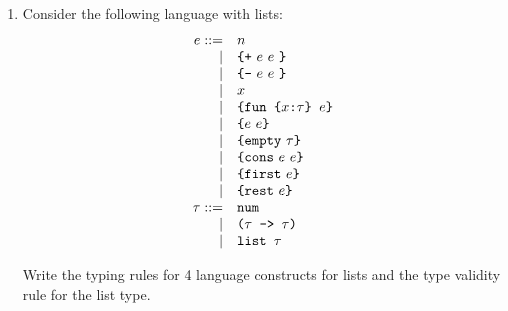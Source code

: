 \begin{enumerate}
\item Consider the following language with lists:
{
\[
\begin{array}{rl}
e ::= & n\\
\mid& \verb!{+!\ e\ e\ \verb+}+\\
\mid& \verb!{-!\ e\ e\ \verb+}+\\
\mid& x\\
\mid& \verb+{fun {+x \verb+:+\tau \verb+} + e\verb+}+\\
\mid& \verb+{+e\ e \verb+}+\\
\mid& \verb+{empty+\ \tau \verb+}+\\
\mid& \verb+{cons+\ e\ e \verb+}+\\
\mid& \verb+{first+\ e \verb+}+\\
\mid& \verb+{rest+\ e \verb+}+\\
\tau ::= & \verb+num+\\
\mid&\verb+(+\tau\verb+ -> +\tau\verb+)+\\
\mid&\verb+list +\tau\\
\end{array}
\]
}

Write the typing rules for 4 language constructs for lists and the type validity rule for the list type.


\end{enumerate}
